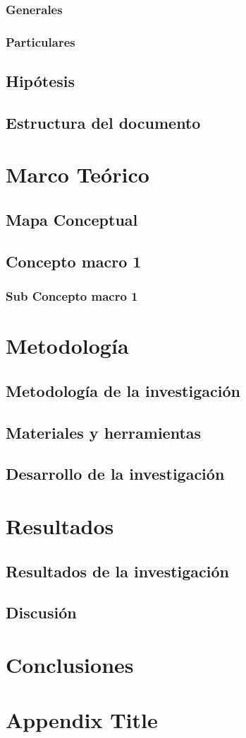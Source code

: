 \documentclass{report}
\begin{document}
\subsection{Generales}
\subsection{Particulares}
\section{Hipótesis}
\section{Estructura del documento}

\chapter{Marco Teórico}
\section{Mapa Conceptual}
\section{Concepto macro 1}
\subsection{Sub Concepto macro 1}

\chapter{Metodología}
\section{Metodología de la investigación}
\section{Materiales y herramientas}
\section{Desarrollo de la investigación}

\chapter{Resultados}
\section{Resultados de la investigación}
\section{Discusión}

\chapter{Conclusiones}

\appendix
\chapter{Appendix Title}



\end{document}

